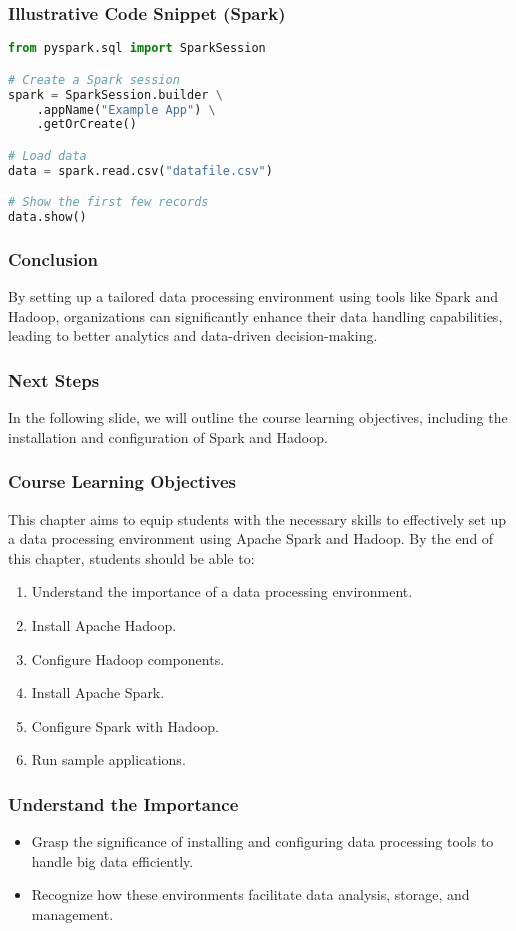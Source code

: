 \documentclass{beamer}
\begin{document}
\begin{frame}[fragile]
    \frametitle{Illustrative Code Snippet (Spark)}
    \begin{lstlisting}[language=Python]
from pyspark.sql import SparkSession

# Create a Spark session
spark = SparkSession.builder \
    .appName("Example App") \
    .getOrCreate()

# Load data
data = spark.read.csv("datafile.csv")

# Show the first few records
data.show()
    \end{lstlisting}
\end{frame}

\begin{frame}
    \frametitle{Conclusion}
    By setting up a tailored data processing environment using tools like Spark and Hadoop, organizations can significantly enhance their data handling capabilities, leading to better analytics and data-driven decision-making.
\end{frame}

\begin{frame}
    \frametitle{Next Steps}
    In the following slide, we will outline the course learning objectives, including the installation and configuration of Spark and Hadoop.
\end{frame}

\begin{frame}[fragile]
    \frametitle{Course Learning Objectives}
    This chapter aims to equip students with the necessary skills to effectively set up a data processing environment using Apache Spark and Hadoop. By the end of this chapter, students should be able to:
    \begin{enumerate}
        \item Understand the importance of a data processing environment.
        \item Install Apache Hadoop.
        \item Configure Hadoop components.
        \item Install Apache Spark.
        \item Configure Spark with Hadoop.
        \item Run sample applications.
    \end{enumerate}
\end{frame}

\begin{frame}[fragile]
    \frametitle{Understand the Importance}
    \begin{itemize}
        \item Grasp the significance of installing and configuring data processing tools to handle big data efficiently.
        \item Recognize how these environments facilitate data analysis, storage, and management.
    \end{itemize}
\end{frame}
\end{document}
